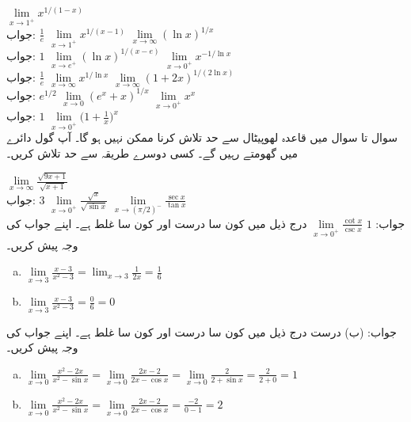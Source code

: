 $\lim\limits_{x\to 1^+}x^{1/(1-x)}$\\
جواب:\quad
$\tfrac{1}{e}$
$\lim\limits_{x\to 1^+}x^{1/(x-1)}$
$\lim\limits_{x\to \infty}(\ln x)^{1/x}$\\
جواب:\quad
$1$
$\lim\limits_{x\to e^+}(\ln x)^{1/(x-e)}$
$\lim\limits_{x\to 0^+}x^{-1/{\ln x}}$\\
جواب:\quad
$\tfrac{1}{e}$
$\lim\limits_{x\to \infty}x^{1/\ln x}$
$\lim\limits_{x\to \infty}(1+2x)^{1/(2\ln x)}$\\
جواب:\quad
$e^{1/2}$
$\lim\limits_{x\to 0}(e^x+x)^{1/x}$
$\lim\limits_{x\to 0^+}x^x$\\
جواب:\quad
$1$
$\lim\limits_{x\to 0^+}\big(1+\frac{1}{x}\big)^x$
\\
سوال  تا سوال  میں قاعدہ لھوپیٹال سے حد تلاش کرنا ممکن نہیں ہو گا۔ آپ گول دائرے میں گھومتے رہیں گے۔ کسی دوسرے طریقہ سے حد تلاش کریں۔

$\lim\limits_{x\to \infty}\frac{\sqrt{9x+1}}{\sqrt{x+1}}$\\
جواب:\quad
$3$
$\lim\limits_{x\to 0^+}\frac{\sqrt{x}}{\sqrt{\sin x}}$
$\lim\limits_{x\to (\pi/2)^-}\frac{\sec x}{\tan x}$\\
جواب:\quad
$1$
$\lim\limits_{x\to 0^+}\frac{\cot x}{\csc x}$
درج ذیل میں کون سا درست اور کون سا غلط ہے۔ اپنے جواب کی وجہ پیش کریں۔
\begin{enumerate}[a.]
\item
$\lim\limits_{x\to 3}\frac{x-3}{x^2-3}=\lim_{x\to3}\frac{1}{2x}=\frac{1}{6}$
\item
$\lim\limits_{x\to 3}\frac{x-3}{x^2-3}=\frac{0}{6}=0$
\end{enumerate}
جواب:\quad
(ب) درست
درج ذیل میں کون سا درست اور کون سا غلط ہے۔ اپنے جواب کی وجہ پیش کریں۔
\begin{enumerate}[a.]
\item
$\lim\limits_{x\to 0}\frac{x^2-2x}{x^2-\sin x}=\lim\limits_{x\to 0}\frac{2x-2}{2x-\cos x}=\lim\limits_{x\to0}\frac{2}{2+\sin x}=\frac{2}{2+0}=1$
\item
$\lim\limits_{x\to 0}\frac{x^2-2x}{x^2-\sin x}=\lim\limits_{x\to 0}\frac{2x-2}{2x-\cos x}=\frac{-2}{0-1}=2$
\end{enumerate}

